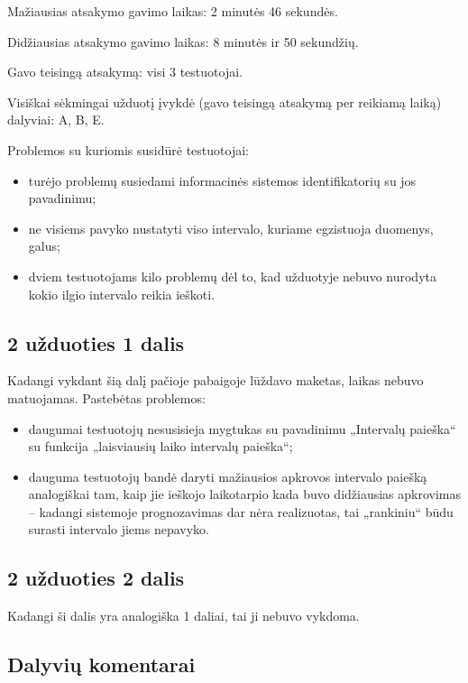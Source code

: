 Mažiausias atsakymo gavimo laikas: 2 minutės 46 sekundės.

Didžiausias atsakymo gavimo laikas: 8 minutės ir 50 sekundžių.

Gavo teisingą atsakymą: visi 3 testuotojai.

Visiškai sėkmingai užduotį įvykdė (gavo teisingą atsakymą per reikiamą 
laiką) dalyviai: A, B, E.

Problemos su kuriomis susidūrė testuotojai:
\begin{itemize}
  \item turėjo problemų susiedami informacinės sistemos identifikatorių
    su jos pavadinimu;
  \item ne visiems pavyko nustatyti viso intervalo, kuriame egzistuoja
    duomenys, galus;
  \item dviem testuotojams kilo problemų dėl to, kad užduotyje nebuvo
    nurodyta kokio ilgio intervalo reikia ieškoti.
\end{itemize}

\subsection{2 užduoties 1 dalis}

Kadangi vykdant šią dalį pačioje pabaigoje lūždavo maketas, laikas
nebuvo matuojamas. Pastebėtas problemos:
\begin{itemize}
  \item daugumai testuotojų nesusisieja mygtukas su pavadinimu „Intervalų
    paieška“ su funkcija „laisviausių laiko intervalų paieška“;
  \item dauguma testuotojų bandė daryti mažiausios apkrovos intervalo
    paiešką analogiškai tam, kaip jie ieškojo laikotarpio kada buvo
    didžiausias apkrovimas – kadangi sistemoje prognozavimas dar nėra
    realizuotas, tai „rankiniu“ būdu surasti intervalo jiems nepavyko.
\end{itemize}

\subsection{2 užduoties 2 dalis}

Kadangi ši dalis yra analogiška 1 daliai, tai ji nebuvo vykdoma.

\subsection{Dalyvių komentarai}

